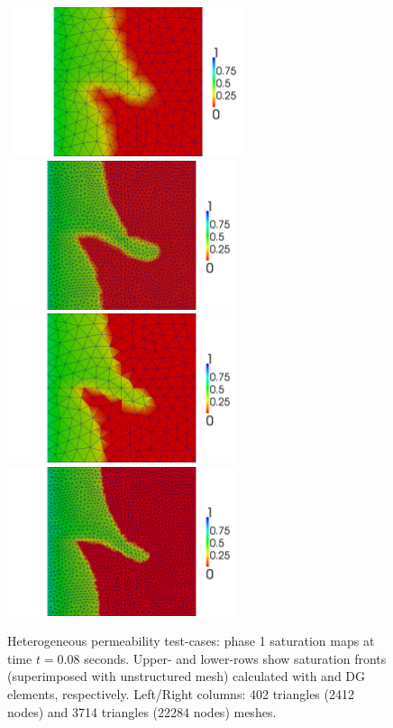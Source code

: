 \begin{figure}[h]
\vbox{\hbox{
\hspace{-1.8cm}\includegraphics[width=0.6\textwidth]{CG_coarse083.png}
\hspace{-0.2cm}\includegraphics[width=0.6\textwidth]{CG_fine083.png}}
\vspace{1.cm}\hbox{
\hspace{-1.8cm}\includegraphics[width=0.6\textwidth]{DG_coarse083.png}
\hspace{-0.2cm}\includegraphics[width=0.6\textwidth]{DG_fine083.png}}}
 \caption{Heterogeneous permeability test-cases: phase 1 saturation maps at time $t=0.08$ seconds. Upper- and lower-rows show saturation fronts (superimposed with unstructured mesh) calculated with  and DG elements, respectively. Left/Right columns: 402 triangles (2412 nodes) and 3714 triangles (22284 nodes) meshes.\label{fig:4reg_maps}}
\end{figure}


